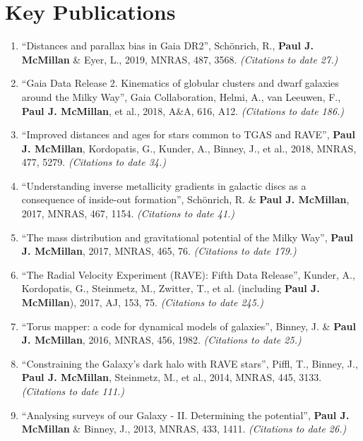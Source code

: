 \documentclass{resume}
\begin{document}
\section*{Key Publications}

\begin{enumerate}
\item ``Distances and parallax bias in Gaia DR2'', Sch\"onrich, R., \textbf{Paul J. McMillan} \& Eyer, L., 2019, MNRAS, 487, 3568. \textit{(Citations to date 27.)}

\item ``Gaia Data Release 2. Kinematics of globular clusters and dwarf galaxies around the Milky Way'', Gaia Collaboration, Helmi, A., van Leeuwen, F., \textbf{Paul J. McMillan}, et al., 2018, A\&A, 616, A12. \textit{(Citations to date 186.)}

\item ``Improved distances and ages for stars common to TGAS and RAVE'', \textbf{Paul J. McMillan}, Kordopatis, G., Kunder, A., Binney, J., et al., 2018, MNRAS, 477, 5279. \textit{(Citations to date 34.)}

\item ``Understanding inverse metallicity gradients in galactic discs as a consequence of inside-out formation'', Sch\"onrich, R. \& \textbf{Paul J. McMillan}, 2017, MNRAS, 467, 1154. \textit{(Citations to date 41.)}

\item ``The mass distribution and gravitational potential of the Milky Way'', \textbf{Paul J. McMillan}, 2017, MNRAS, 465, 76. \textit{(Citations to date 179.)}

\item ``The Radial Velocity Experiment (RAVE): Fifth Data Release'', Kunder, A., Kordopatis, G., Steinmetz, M., Zwitter, T., et al. (including \textbf{Paul J. McMillan}), 2017, AJ, 153, 75. \textit{(Citations to date 245.)}

\item ``Torus mapper: a code for dynamical models of galaxies'', Binney, J. \& \textbf{Paul J. McMillan}, 2016, MNRAS, 456, 1982. \textit{(Citations to date 25.)}

\item ``Constraining the Galaxy's dark halo with RAVE stars'', Piffl, T., Binney, J., \textbf{Paul J. McMillan}, Steinmetz, M., et al., 2014, MNRAS, 445, 3133. \textit{(Citations to date 111.)}

\item ``Analysing surveys of our Galaxy - II. Determining the potential'', \textbf{Paul J. McMillan} \& Binney, J., 2013, MNRAS, 433, 1411. \textit{(Citations to date 26.)}


\end{enumerate}
\end{document}
